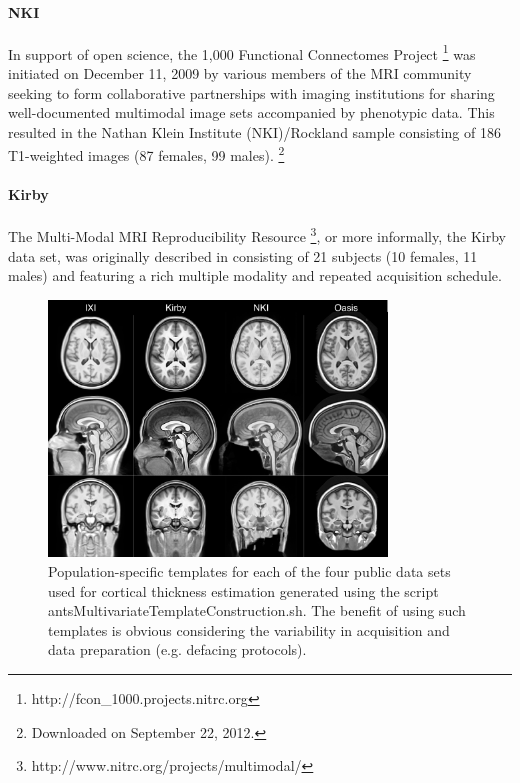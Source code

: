 \paragraph{NKI}
In support of open science, the 1,000 Functional Connectomes Project%
\footnote{ 
http://fcon\_1000.projects.nitrc.org
}
was initiated on December 11, 2009 by various members of the MRI community
seeking to form collaborative partnerships with imaging institutions for 
sharing well-documented multimodal image sets accompanied by phenotypic data.
This resulted in the Nathan Klein Institute (NKI)/Rockland sample
consisting of 186 T1-weighted
images (87 females, 99 males).%
\footnote{
Downloaded on September 22, 2012.
}

\paragraph{Kirby}
The Multi-Modal MRI Reproducibility Resource%
\footnote{
http://www.nitrc.org/projects/multimodal/
}, 
or more informally, the Kirby
data set, was originally described in \cite{landman2011} consisting of 
21 subjects (10 females, 11 males) and featuring a rich multiple modality and 
repeated acquisition schedule.

\begin{figure}
  \centering
  \includegraphics[width=90mm]{Figures/templates.pdf}
  \caption{Population-specific templates for each of the four public data sets used 
  for cortical thickness 
  estimation generated using the script antsMultivariateTemplateConstruction.sh. 
  The benefit of using such templates is obvious considering the variability in
  acquisition and data preparation (e.g. defacing protocols).
  }
  \label{fig:template}
\end{figure}


